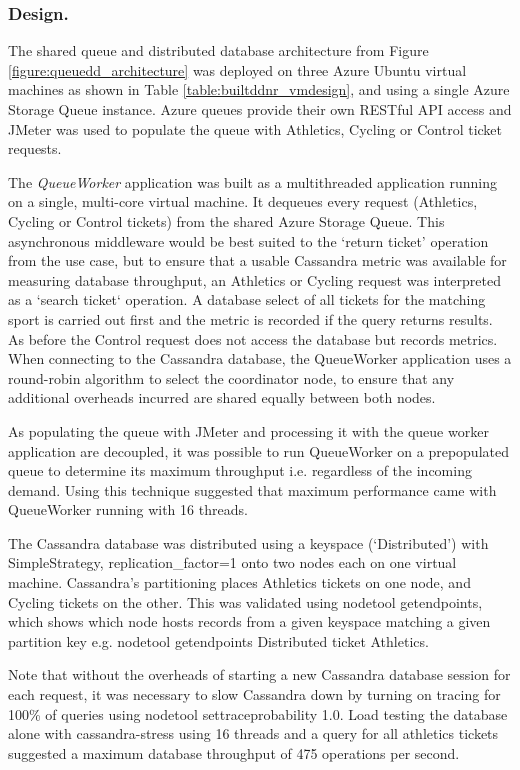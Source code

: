 \subsubsection{Design.}  The shared queue and distributed database architecture from Figure \ref{figure:queuedd_architecture} was deployed on three Azure Ubuntu virtual machines as shown in Table \ref{table:builtddnr_vmdesign}, and using a single Azure Storage Queue instance.  Azure queues provide their own RESTful API access and JMeter was used to populate the queue with Athletics, Cycling or Control ticket requests.

The {\itshape QueueWorker} application was built as a multithreaded application running on a single, multi-core virtual machine.  It dequeues every request (Athletics, Cycling or Control tickets) from the shared Azure Storage Queue.  This asynchronous middleware would be best suited to the `return ticket' operation from the use case, but to ensure that a usable Cassandra metric was available for measuring database throughput, an Athletics or Cycling request was interpreted as a `search ticket` operation.  A database select of all tickets for the matching sport is carried out first and the metric is recorded if the query returns results.  As before the Control request does not access the database but records metrics.  When connecting to the Cassandra database, the QueueWorker application uses a round-robin algorithm to select the coordinator node, to ensure that any additional overheads incurred are shared equally between both nodes.

As populating the queue with JMeter and processing it with the queue worker application are decoupled, it was possible to run QueueWorker on a prepopulated queue to determine its maximum throughput i.e. regardless of the incoming demand.  Using this technique suggested that maximum performance came with QueueWorker running with 16 threads.

The Cassandra database was distributed using a keyspace (`Distributed') with SimpleStrategy, replication\_factor=1 onto two nodes each on one virtual machine.  Cassandra's partitioning places Athletics tickets on one node, and Cycling tickets on the other.  This was validated using nodetool getendpoints, which shows which node hosts records from a given keyspace matching a given partition key e.g. nodetool getendpoints Distributed ticket Athletics.

Note that without the overheads of starting a new Cassandra database session for each request, it was necessary to slow Cassandra down by turning on tracing for 100\% of queries using nodetool settraceprobability 1.0.  Load testing the database alone with cassandra-stress using 16 threads and a query for all athletics tickets suggested a maximum database throughput of 475 operations per second.

